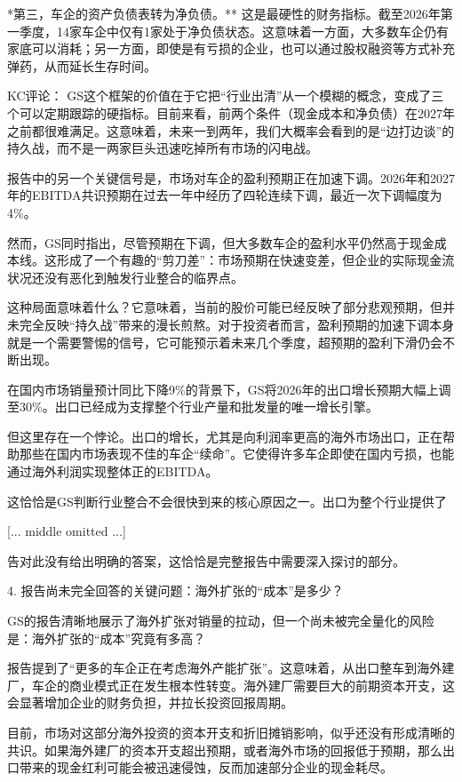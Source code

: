 \documentclass[11pt]{ctexart}
\begin{document}
*第三，车企的资产负债表转为净负债。** 这是最硬性的财务指标。截至2026年第一季度，14家车企中仅有1家处于净负债状态。这意味着一方面，大多数车企仍有家底可以消耗；另一方面，即使是有亏损的企业，也可以通过股权融资等方式补充弹药，从而延长生存时间。

KC评论： GS这个框架的价值在于它把“行业出清”从一个模糊的概念，变成了三个可以定期跟踪的硬指标。目前来看，前两个条件（现金成本和净负债）在2027年之前都很难满足。这意味着，未来一到两年，我们大概率会看到的是“边打边谈”的持久战，而不是一两家巨头迅速吃掉所有市场的闪电战。

报告中的另一个关键信号是，市场对车企的盈利预期正在加速下调。2026年和2027年的EBITDA共识预期在过去一年中经历了四轮连续下调，最近一次下调幅度为4\%。

然而，GS同时指出，尽管预期在下调，但大多数车企的盈利水平仍然高于现金成本线。这形成了一个有趣的“剪刀差”：市场预期在快速变差，但企业的实际现金流状况还没有恶化到触发行业整合的临界点。

这种局面意味着什么？它意味着，当前的股价可能已经反映了部分悲观预期，但并未完全反映“持久战”带来的漫长煎熬。对于投资者而言，盈利预期的加速下调本身就是一个需要警惕的信号，它可能预示着未来几个季度，超预期的盈利下滑仍会不断出现。

在国内市场销量预计同比下降9\%的背景下，GS将2026年的出口增长预期大幅上调至30\%。出口已经成为支撑整个行业产量和批发量的唯一增长引擎。

但这里存在一个悖论。出口的增长，尤其是向利润率更高的海外市场出口，正在帮助那些在国内市场表现不佳的车企“续命”。它使得许多车企即使在国内亏损，也能通过海外利润实现整体正的EBITDA。

这恰恰是GS判断行业整合不会很快到来的核心原因之一。出口为整个行业提供了

[... middle omitted ...]

告对此没有给出明确的答案，这恰恰是完整报告中需要深入探讨的部分。

4. 报告尚未完全回答的关键问题：海外扩张的“成本”是多少？

GS的报告清晰地展示了海外扩张对销量的拉动，但一个尚未被完全量化的风险是：海外扩张的“成本”究竟有多高？

报告提到了“更多的车企正在考虑海外产能扩张”。这意味着，从出口整车到海外建厂，车企的商业模式正在发生根本性转变。海外建厂需要巨大的前期资本开支，这会显著增加企业的财务负担，并拉长投资回报周期。

目前，市场对这部分海外投资的资本开支和折旧摊销影响，似乎还没有形成清晰的共识。如果海外建厂的资本开支超出预期，或者海外市场的回报低于预期，那么出口带来的现金红利可能会被迅速侵蚀，反而加速部分企业的现金耗尽。
\end{document}

